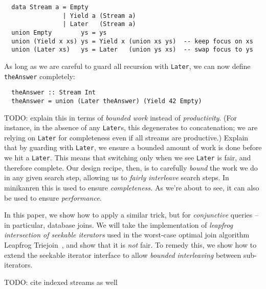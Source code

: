 \documentclass[acmsmall,screen,review,anonymous,dvipsnames]{acmart}
\newcommand\hask[1]{\texttt{#1}}
\newcommand\todo[1]{{\color{Orange}#1}}
\begin{document}

\begin{verbatim}
  data Stream a = Empty
                | Yield a (Stream a)
                | Later   (Stream a)
  union Empty        ys = ys
  union (Yield x xs) ys = Yield x (union xs ys)  -- keep focus on xs
  union (Later xs)   ys = Later   (union ys xs)  -- swap focus to ys
\end{verbatim}

\noindent
As long as we are careful to guard all recursion with \hask{Later}, we can now define \texttt{theAnswer} completely:

\begin{verbatim}
  theAnswer :: Stream Int
  theAnswer = union (Later theAnswer) (Yield 42 Empty)
\end{verbatim}

\noindent
\todo{%
  TODO: explain this in terms of \emph{bounded work} instead of \emph{productivity}.
  (For instance, in the absence of any \hask{Later}s, this degenerates to concatenation; we are relying on \hask{Later} for completeness even if all streams are productive.)
  Explain that by guarding with \hask{Later}, we ensure a bounded amount of work is done before we hit a \hask{Later}.
  This means that switching only when we see \hask{Later} is fair, and therefore complete.
  Our design recipe, then, is to carefully \emph{bound} the work we do in any given search step, allowing us to \emph{fairly interleave} search steps.
  In minikanren this is used to ensure \emph{completeness.}
  As we're about to see, it can also be used to ensure \emph{performance.}
}


In this paper, we show how to apply a similar trick, but for \emph{conjunctive} queries -- in particular, database joins.
We will take the implementation of \emph{leapfrog intersection of seekable iterators} used in the worst-case optimal join algorithm Leapfrog Triejoin~\citep{lftj}, and show that it is \emph{not} fair.
To remedy this, we show how to extend the seekable iterator interface to allow \emph{bounded interleaving} between sub-iterators.

\todo{TODO: cite indexed streams as well}


\end{document}
